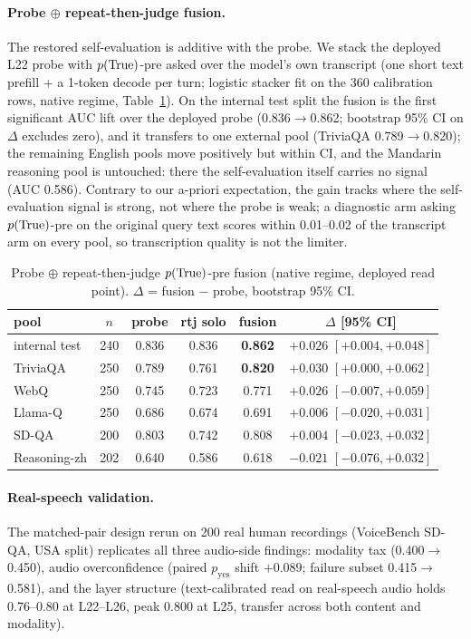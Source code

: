 \paragraph{Probe $\oplus$ repeat-then-judge fusion.} The restored
self-evaluation is additive with the probe. We stack the
deployed L22 probe with $p(\mathrm{True})$-pre asked over the model's own
transcript (one short text prefill + a 1-token decode per turn;
logistic stacker fit on the 360 calibration rows, native regime,
Table~\ref{tab:rtjfusion}). On the internal test split the fusion is
the first significant AUC lift over the deployed probe
(0.836$\to$0.862; bootstrap 95\% CI on $\Delta$ excludes zero), and it
transfers to one external pool (TriviaQA 0.789$\to$0.820); the
remaining English pools move positively but within CI, and the
Mandarin reasoning pool is untouched: there the self-evaluation
itself carries no signal (AUC 0.586). Contrary to our a-priori
expectation, the gain tracks where the self-evaluation signal is
strong, not where the probe is weak; a diagnostic arm asking
$p(\mathrm{True})$-pre on the original query text scores within 0.01--0.02 of
the transcript arm on every pool, so transcription quality is not the
limiter.

\begin{table}[h]
\centering\small
\caption{Probe $\oplus$ repeat-then-judge $p(\mathrm{True})$-pre fusion (native
regime, deployed read point). $\Delta$ = fusion $-$ probe, bootstrap
95\% CI.}
\label{tab:rtjfusion}
\begin{tabular}{lccccc}
\toprule
pool & $n$ & probe & rtj solo & fusion & $\Delta$ [95\% CI] \\
\midrule
internal test & 240 & 0.836 & 0.836 & \textbf{0.862} & $+0.026$ $[+0.004,+0.048]$ \\
TriviaQA & 250 & 0.789 & 0.761 & \textbf{0.820} & $+0.030$ $[+0.000,+0.062]$ \\
WebQ & 250 & 0.745 & 0.723 & 0.771 & $+0.026$ $[-0.007,+0.059]$ \\
Llama-Q & 250 & 0.686 & 0.674 & 0.691 & $+0.006$ $[-0.020,+0.031]$ \\
SD-QA & 200 & 0.803 & 0.742 & 0.808 & $+0.004$ $[-0.023,+0.032]$ \\
Reasoning-zh & 202 & 0.640 & 0.586 & 0.618 & $-0.021$ $[-0.076,+0.032]$ \\
\bottomrule
\end{tabular}
\end{table}

\paragraph{Real-speech validation.} The matched-pair design rerun on
200 real human recordings (VoiceBench SD-QA, USA split) replicates all
three audio-side findings: modality tax (0.400$\to$0.450),
audio overconfidence (paired $p_{\mathrm{yes}}$ shift $+0.089$; failure
subset 0.415$\to$0.581), and the layer structure (text-calibrated read on
real-speech audio holds 0.76--0.80 at L22--L26, peak 0.800 at L25,
transfer across both content and modality).

